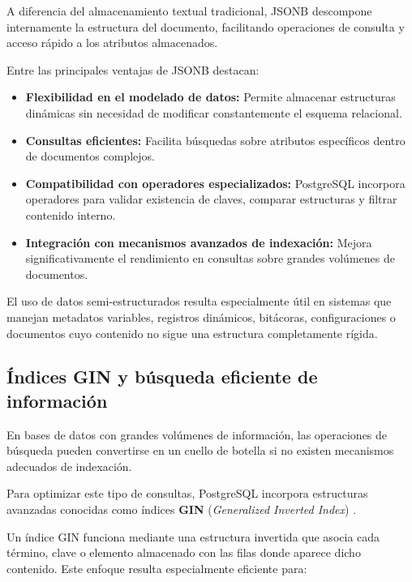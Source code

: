 \documentclass[12pt, oneside, letterpaper]{book}
\begin{document}
A diferencia del almacenamiento textual tradicional, JSONB descompone internamente la estructura del documento, facilitando operaciones de consulta y acceso rápido a los atributos almacenados.

Entre las principales ventajas de JSONB destacan:

\begin{itemize}

\item \textbf{Flexibilidad en el modelado de datos:} Permite almacenar estructuras dinámicas sin necesidad de modificar constantemente el esquema relacional.

\item \textbf{Consultas eficientes:} Facilita búsquedas sobre atributos específicos dentro de documentos complejos.

\item \textbf{Compatibilidad con operadores especializados:} PostgreSQL incorpora operadores para validar existencia de claves, comparar estructuras y filtrar contenido interno.

\item \textbf{Integración con mecanismos avanzados de indexación:} Mejora significativamente el rendimiento en consultas sobre grandes volúmenes de documentos.
\end{itemize}

El uso de datos semi-estructurados resulta especialmente útil en sistemas que manejan metadatos variables, registros dinámicos, bitácoras, configuraciones o documentos cuyo contenido no sigue una estructura completamente rígida.

\subsection{Índices GIN y búsqueda eficiente de información}

En bases de datos con grandes volúmenes de información, las operaciones de búsqueda pueden convertirse en un cuello de botella si no existen mecanismos adecuados de indexación.

Para optimizar este tipo de consultas, PostgreSQL incorpora estructuras avanzadas conocidas como índices \textbf{GIN} (\textit{Generalized Inverted Index}) \cite{60}.

Un índice GIN funciona mediante una estructura invertida que asocia cada término, clave o elemento almacenado con las filas donde aparece dicho contenido. Este enfoque resulta especialmente eficiente para:
\end{document}
